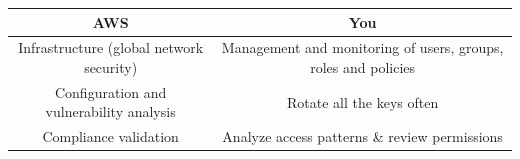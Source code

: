 \begin{table}[h]
    \centering
    \begin{tabular}{||c c||}
        \hline
        \multicolumn{1}{||c|}{\textbf{AWS}}                                & \textbf{You} \\ \hline
        \multicolumn{1}{||c|}{Infrastructure (global network security)}    & Management and monitoring of users, groups, roles and policies \\ \hline
        \multicolumn{1}{||c|}{Configuration and vulnerability analysis}    & Rotate all the keys often \\ \hline
        \multicolumn{1}{||c|}{Compliance validation}                       & Analyze access patterns \& review permissions \\ \hline
    \end{tabular}
    \newline\newline
    \label{tab:iam-share-responsibility-model-table}
\end{table}

